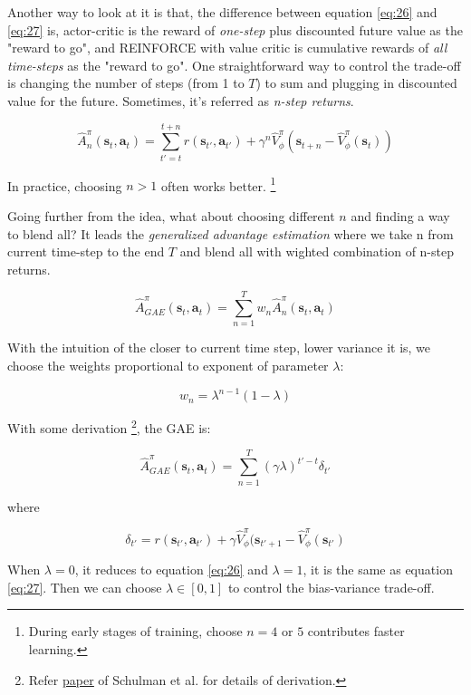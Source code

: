 \documentclass{tufte-handout}
\newcommand{\s}{\mathbf{s}}
\newcommand{\act}{\mathbf{a}}
\begin{document}
Another way to look at it is that, the difference between equation \ref{eq:26} and \ref{eq:27} is, actor-critic is the reward of \emph{one-step} plus discounted future value as the "reward to go", and REINFORCE with value critic is cumulative rewards of \emph{all time-steps} as the "reward to go". One straightforward way to control the trade-off is changing the number of steps (from 1 to $T$) to sum and plugging in discounted value for the future. Sometimes, it's referred as \emph{n-step returns}.

\begin{equation}
\label{eq:28}
\hat{A}_n^\pi (\s_t, \act_t) =\sum_{t'=t} ^ {t+n} r(\s_{t'}, \act_{t'}) + \gamma^{n} \hat{V} ^\pi_\phi(\s_{t+n} - \hat{V}^\pi_\phi(\s_t))
\end{equation}

In practice, choosing $n > 1$ often works better. \thanks{During early stages of training, choose $n = 4$ or $5$ contributes faster learning. }

Going further from the idea, what about choosing different $n$ and finding a way to blend all? It leads the \emph{generalized advantage estimation} where
we take n from current time-step to the end $T$ and blend all with wighted combination of n-step returns.

\begin{equation}
\label{eq:29}
\hat{A}^\pi _{GAE}(\s_t, \act_t) = \sum_{n=1}^T w_n \hat{A}_n^\pi (\s_t, \act_t)
\end{equation}

With the intuition of the closer to current time step, lower variance it is, we choose the weights proportional to exponent of parameter $\lambda$:

\begin{equation}
\label{eq:30}
w_n = {\lambda ^ {n -1}}{(1 - \lambda)}
\end{equation}

With some derivation \thanks{Refer \href{https://arxiv.org/pdf/1506.02438.pdf}{\underline{paper}} of Schulman et al. for details of derivation.},
the GAE is:

\[
\hat{A}^\pi _{GAE}(\s_t, \act_t) = \sum_{n=1}^T (\gamma \lambda) ^{t' - t} \delta_{t'}
\]

where

\[
\delta_{t'} = r(\s_{t'}, \act_{t'}) + \gamma \hat{V} ^\pi_\phi (\s_{t' + 1} - \hat{V} ^\pi_\phi (\s_{t'} )
\]

When $\lambda = 0$, it reduces to equation \ref{eq:26} and $\lambda = 1$, it is the same as equation \ref{eq:27}. Then we can choose
$\lambda \in [0, 1]$ to control the bias-variance trade-off.
\end{document}
